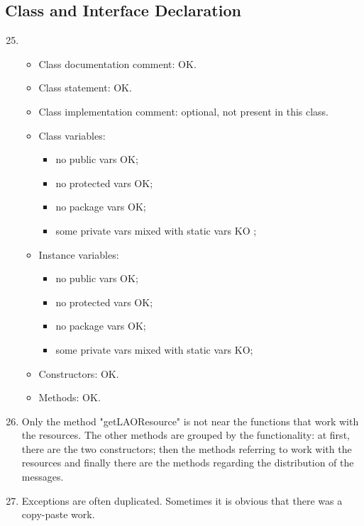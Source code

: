 \subsection{Class and Interface Declaration}
\begin{enumerate}
	\setcounter{enumi}{24}
	\item
	\begin{itemize}
		\item Class documentation comment: OK.
		\item Class statement: OK.
		\item Class implementation comment: optional, not present in this class.
		\item Class variables:
		\begin{itemize}
			\item no public vars OK;
			
			\item no protected vars OK;
			
			\item no package vars OK;
			
			\item some private vars mixed with static vars \color{red}KO \color{black};
		\end{itemize}
		\item Instance variables:
		\begin{itemize}
			\item no public vars OK;
			
			\item no protected vars OK;
			
			\item no package vars OK;
			
			\item some private vars mixed with static vars \color{red}KO\color{black};
		\end{itemize}
		\item Constructors: OK.
		\item Methods: OK.
	\end{itemize}
	\item Only the method "getLAOResource" is not near the functions that work with the resources. The other methods are grouped by the functionality: at first, there are the two constructors; then the methods referring to work with the resources and finally there are the methods regarding the distribution of the messages.
	\item Exceptions are often duplicated. Sometimes it is obvious that there was a copy-paste work.
\end{enumerate}
